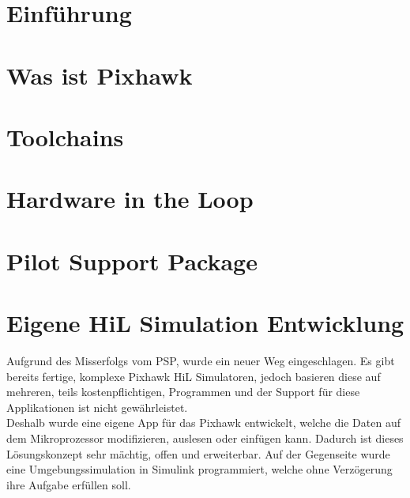 \documentclass[a4paper,10pt,fleqn]{article}
\begin{document}









\begin{multicols}{2}
	\glsaddall
	\printglossary[title=Glossar]
\end{multicols}
\clearpage


\section{Einführung}
\label{sec:Einführung}



\section{Was ist Pixhawk}
\label{sec:Was ist Pixhawk}


%






\section{Toolchains}
\label{sec:Toolchains}



\section{Hardware in the Loop}
\label{sec:Hardware in the Loop}





\section{Pilot Support Package}
\label{sec:Pilot Support Package}

%




\section{Eigene HiL Simulation Entwicklung}
Aufgrund des Misserfolgs vom PSP, wurde ein neuer Weg eingeschlagen. Es gibt bereits fertige, komplexe Pixhawk HiL Simulatoren, jedoch basieren diese auf mehreren, teils kostenpflichtigen, Programmen und der Support für diese Applikationen ist nicht gewährleistet.\\
Deshalb wurde eine eigene App für das Pixhawk entwickelt, welche die Daten auf dem Mikroprozessor modifizieren, auslesen oder einfügen kann. Dadurch ist dieses Lösungskonzept sehr mächtig, offen und erweiterbar. Auf der Gegenseite wurde eine Umgebungssimulation in Simulink programmiert, welche ohne Verzögerung ihre Aufgabe erfüllen soll.
\end{document}
